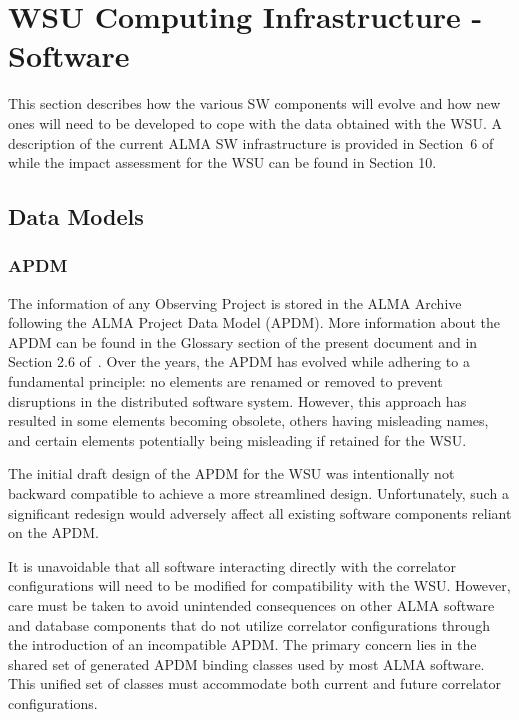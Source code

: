 \section{WSU Computing Infrastructure - Software}
\label{sec:wsu_compu_sw}
This section describes how the various SW components will evolve and how new ones will need to be developed to cope with the data obtained with the WSU.  A description of the current ALMA SW infrastructure is provided in Section~6 of~\cite{CSA-IA} while the impact assessment for the WSU can be found in Section 10.

\subsection{Data Models}\label{subsec:ASDM-APDM}

\subsubsection{APDM}
The information of any Observing Project is stored in the ALMA Archive following the ALMA Project Data Model (APDM). More information about the APDM can be found in the Glossary section of the present document and in Section 2.6 of~\cite{CSA-IA}. Over the years, the APDM has evolved while adhering to a fundamental principle: no elements are renamed or removed to prevent disruptions in the distributed software system. However, this approach has resulted in some elements becoming obsolete, others having misleading names, and certain elements potentially being misleading if retained for the WSU.

The initial draft design of the APDM for the WSU was intentionally not backward compatible to achieve a more streamlined design. Unfortunately, such a significant redesign would adversely affect all existing software components reliant on the APDM.

It is unavoidable that all software interacting directly with the correlator configurations will need to be modified for compatibility with the WSU. However, care must be taken to avoid unintended consequences on other ALMA software and database components that do not utilize correlator configurations through the introduction of an incompatible APDM. The primary concern lies in the shared set of generated APDM binding classes used by most ALMA software. This unified set of classes must accommodate both current and future correlator configurations.

